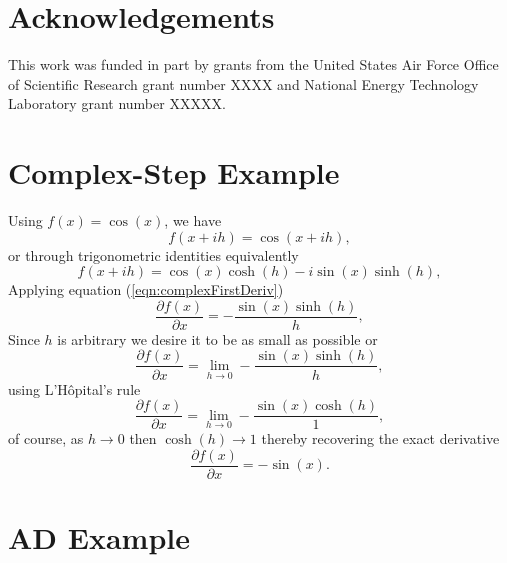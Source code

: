 \documentclass[preprint,12pt]{elsarticle}
\begin{document}

\section{Acknowledgements}
This work was funded in part by grants from the United States Air Force Office of Scientific
Research grant number XXXX and National Energy Technology Laboratory grant number XXXXX. 
\label{sec:ack}





\appendix
\renewcommand*{\thesection}{\Alph{section}}
%
\section{Complex-Step Example}
\label{sec:appendixA}
%
Using $f(x) = \cos(x)$, we have
%
\[
f (x + i h) = \cos(x + i h),
\]
%
or through trigonometric identities equivalently
%
\[
f(x + i h) = \cos(x) \cosh(h) - i \sin(x) \sinh(h),
\]
%
Applying equation (\ref{eqn:complexFirstDeriv})
\[
\frac{\partial f(x)}{\partial x} = - \frac{\sin(x) \sinh(h)}{h},
\]
Since $h$ is arbitrary we desire it to be as small as possible or
\[
\frac{\partial f(x)}{\partial x} = \lim_{h \to 0} - \frac{\sin(x) \sinh(h)}{h},
\]
using L'H\^opital's rule
\[
\frac{\partial f(x)}{\partial x} = \lim_{h \to 0} - \frac{\sin(x) \cosh(h)}{1},
\]
of course, as $h \to 0$ then $\cosh(h) \to 1$ thereby recovering the exact derivative
\[
\frac{\partial f(x)}{\partial x} =-\sin(x).
\]

\section{AD Example}
\label{sec:appendixB}
\end{document}
